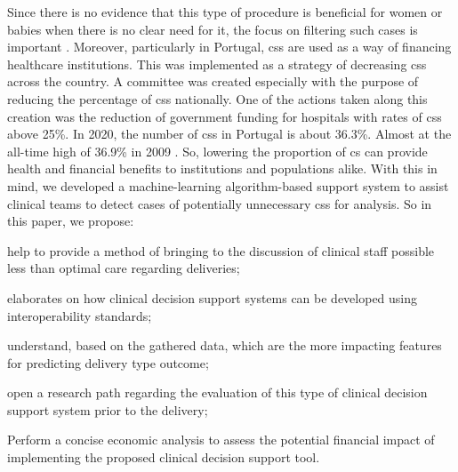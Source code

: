 Since there is no evidence that this type of procedure is beneficial for women or babies when there is no clear need for it, the focus on filtering such cases is important \cite{chenNonClinicalInterventions2018}.
Moreover, particularly in Portugal, \acp{cs} are used as a way of financing healthcare institutions. This was implemented as a strategy of decreasing \acp{cs} across the country. A committee was created especially with the purpose of reducing the percentage of \acp{cs} nationally. One of the actions taken along this creation was the reduction of government funding for hospitals with rates of \acp{cs} above 25\%.
In 2020, the number of \acp{cs} in Portugal is about 36.3\%. Almost at the all-time high of 36.9\% in 2009 \cite{pordatacesarianas}.
So, lowering the proportion of \ac{cs} can provide health and financial benefits to institutions and populations alike. With this in mind, we developed a  machine-learning algorithm-based support system to assist clinical teams to detect cases of potentially unnecessary \acp{cs} for analysis. So in this paper, we propose:
\begin{myitemize}
    \item help to provide a method of bringing to the discussion of clinical staff possible less than optimal care regarding deliveries;
    \item elaborates on how clinical decision support systems can be developed using interoperability standards;
    \item understand, based on the gathered data, which are the more impacting features for predicting delivery type outcome;
    \item open a research path regarding the evaluation of this type of clinical decision support system prior to the delivery;
    \item Perform a concise economic analysis to assess the potential financial impact of implementing the proposed clinical decision support tool.

\end{myitemize}